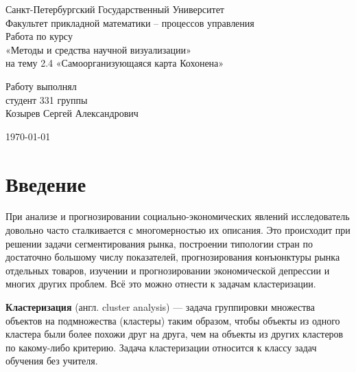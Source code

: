 \documentclass[a4paper,12pt]{article}
\begin{document}
\begin{titlepage}
  \centering

  \vspace*{3em}
  
  Санкт-Петербургский Государственный Университет \\
  Факультет прикладной математики – процессов управления \\[15em] 

  { \large 
  Работа по курсу \\
  «Методы и средства научной визуализации» \\
  на тему 2.4 «Самоорганизующаяся карта Кохонена»\\[10em]
  } %

  \begin{flushright} %
    Работу выполнял \\
    студент 331 группы \\
    Козырев Сергей Александрович \\[10em]
  \end{flushright}

  \today
\end{titlepage}

\newpage
\tableofcontents

\newpage

\section{Введение}

При анализе и прогнозировании социально-экономических явлений исследователь довольно часто сталкивается с многомерностью их описания. Это  происходит при решении задачи сегментирования рынка, построении типологии стран по достаточно большому числу показателей, прогнозирования конъюнктуры рынка отдельных товаров, изучении и прогнозировании экономической депрессии и многих других проблем.\cite{intro1} Всё это можно отнести к задачам кластеризации.

\textbf{Кластеризация} (англ. cluster analysis) — задача группировки множества объектов на подмножества (кластеры) таким образом, чтобы объекты из одного кластера были более похожи друг на друга, чем на объекты из других кластеров по какому-либо критерию. Задача кластеризации относится к классу задач обучения без учителя.\cite{clustering}
\end{document}
